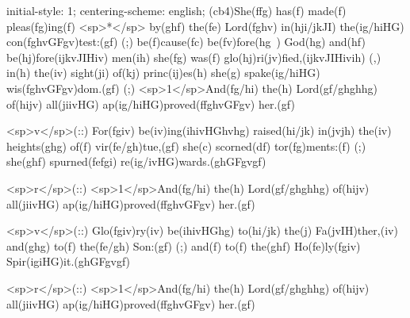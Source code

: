 initial-style: 1;
centering-scheme: english;
(cb4)She(ffg) has(f) made(f) pleas(fg)ing(f) <sp>*</sp> by(ghf) the(fe) Lord(fghv) in(hji/jkJI) the(ig/hiHG) con(fghvGFgv)test:(gf) (;) be(f)cause(fc) be(fv)fore(hg~) God(hg) and(hf) be(hj)fore(ijkvJIHiv) men(ih) she(fg) was(f) glo(hj)ri(jv)fied,(ijkvJIHivih) (,) in(h) the(iv) sight(ji) of(kj) princ(ij)es(h) she(g) spake(ig/hiHG) wis(fghvGFgv)dom.(gf) (;) <sp>1</sp>And(fg/hi) the(h) Lord(gf/ghghhg) of(hijv) all(jiivHG) ap(ig/hiHG)proved(ffghvGFgv) her.(gf)

<sp>v</sp>(::) For(fgiv) be(iv)ing(ihivHGhvhg) raised(hi/jk) in(jvjh) the(iv) heights(ghg) of(f) vir(fe/gh)tue,(gf) she(c) scorned(df) tor(fg)ments:(f) (;) she(ghf) spurned(fefgi) re(ig/ivHG)wards.(ghGFgvgf)

<sp>r</sp>(::) <sp>1</sp>And(fg/hi) the(h) Lord(gf/ghghhg) of(hijv) all(jiivHG) ap(ig/hiHG)proved(ffghvGFgv) her.(gf)

<sp>v</sp>(::) Glo(fgiv)ry(iv) be(ihivHGhg) to(hi/jk) the(j) Fa(jvIH)ther,(iv) and(ghg) to(f) the(fe/gh) Son:(gf) (;) and(f) to(f) the(ghf) Ho(fe)ly(fgiv) Spir(igiHG)it.(ghGFgvgf)

<sp>r</sp>(::) <sp>1</sp>And(fg/hi) the(h) Lord(gf/ghghhg) of(hijv) all(jiivHG) ap(ig/hiHG)proved(ffghvGFgv) her.(gf)